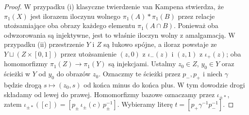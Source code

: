 \begin{proof}
W przypadku (i) klasyczne twierdzenie van Kampena stwierdza, że
$\pi_1(X)$ jest ilorazem iloczynu wolnego
$\pi_1(A)*\pi_1(B)$ przez relacje utożsamiające
oba obrazy każdego elementu $\pi_1(A\cap B)$.
Ponieważ oba odwzorowania są injektywne, jest to
właśnie iloczyn wolny z amalgamacją. W przypadku (ii) przestrzenie $Y$ i $Z$ są łukowo spójne,
a iloraz powstaje ze $Y\sqcup(Z\times[0,1])$ przez
utożsamienie $(z,0)$ z $\iota_-(z)$ i $(z,1)$ z
$\iota_+(z)$; oba homomorfizmy $\pi_1(Z)\to\pi_1(Y)$
są injekcjami. Ustalmy $z_0\in Z$, $y_0\in Y$
oraz ścieżki w $Y$ od $y_0$ do obrazów $z_0$.
Oznaczmy te ścieżki przez $p_-,p_+$ i niech
$\gamma$ będzie drogą $s\mapsto(z_0,s)$ od końca
minus do końca plus. W tym dowodzie drogi
składamy od lewej do prawej. Homomorfizmy bazowe
oznaczamy przez $\iota_{\pm*}$, zatem
$\iota_{\pm*}([c])=[p_\pm\,\iota_\pm(c)\,p_\pm^{-1}]$.
Wybieramy literę
$t=[p_+\gamma^{-1}p_-^{-1}]$.


\end{proof}
